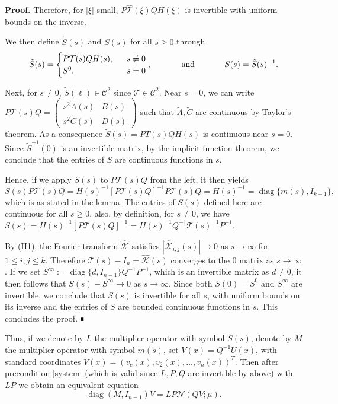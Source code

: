 \documentclass[letterpaper,11pt]{article}
\newcommand{\Nl}{\mathcal{N}}
\newcommand{\K}{\mathcal{K}}
\newcommand{\That}{\widehat{\mathcal{T}}}
\newcommand{\diag}{\operatorname{diag}}
\numberwithin{equation}{section}
\theoremstyle{plain}
\theoremstyle{remark}
\newenvironment{Proof}[1][.]%
 {\begin{trivlist}\item[]\textbf{Proof#1 }}%
 {\hspace*{\fill}$\rule{0.3\baselineskip}{0.35\baselineskip}$\end{trivlist}}
\begin{document}
\begin{Proof}
Therefore, for $|\xi|$ small, $P\That(\xi)QH(\xi)$ is invertible with uniform bounds on the inverse.

 We then define $\tilde{S}(s)$ and $S(s)$ for all $s\ge 0$ through
\[
\tilde{S}(s)=\begin{cases}
P\mathcal{T}(s)QH(s),\hspace{0.1in} &s\neq 0\\ 
S^0.\hspace{0.1in} &s=0
\end{cases}, \hspace{0.5in}\text{and}\hspace{0.5in} S(s) = \tilde{S}(s)^{-1}.
\]


Next, for $s \neq 0$, $\tilde{S}(\ell) \in \mathscr{C}^2$ since $\mathcal{T} \in \mathscr{C}^2$. Near $s = 0$, we can write $P\mathcal{T}(s)Q = \begin{pmatrix}
s^2\tilde{A}(s)&B(s)\\
s^2\tilde{C}(s)&D(s)
\end{pmatrix}$ such that $\tilde{A},\tilde{C}$ are continuous by Taylor's theorem. As a consequence $\tilde{S}(s)= PT(s)QH(s)$ is continuous near $s = 0$. Since $\tilde{S}^{-1}(0)$ is an invertible matrix, by the implicit function theorem, we conclude that the entries of $S$ are continuous functions in $s$.
 
Hence, if we apply $S(s)$ to $P\mathcal{T}(s)Q$ from the left, it then yields
 \[
 S(s)P\mathcal{T}(s)Q = H(s)^{-1}[P\mathcal{T}(s)Q]^{-1}P\mathcal{T}(s)Q = H(s)^{-1}=\diag\{m(s),I_{k-1}\},
 \]
 which is as stated in the lemma.
 The entries of $S(s)$ defined here are continuous for all $s \ge 0$,  also, by definition, for $s \neq 0$, we have $S(s) = H(s)^{-1}[P\mathcal{T}(s)Q]^{-1} = H(s)^{-1}Q^{-1}\mathcal{T}(s)^{-1}P^{-1}$.
 
By (H1), the Fourier transform $\widehat{\K}$ satisfies $|\widehat{\K}_{i,j}(s)| \to 0$ as $s \to \infty$ for $1\le i,j\le k$. Therefore $\mathcal{T}(s)-I_n=\widehat{\K}(s)$ converges to the $0$ matrix as $s \to 
\infty$. If we set $S^\infty := \diag\{d,I_{n-1}\}Q^{-1}P^{-1}$, which is an invertible matrix as $d\neq 0$, it then follows that $S(s)-S^\infty\to 0$ as $s \to \infty$. Since both $S(0)=S^0$ and $S^\infty$ are invertible, we conclude that $S(s)$ is invertible for all $s$, with uniform bounds on its inverse and the entries of $S$ are bounded continuous functions in $s$. This concludes the proof.
 \end{Proof}
Thus, if we denote by $L$ the multiplier operator with symbol $S(s)$, denote by $M$ the multiplier operator with symbol $m(s)$, set $V(x)=Q^{-1}U(x)$, with standard coordinates $V(x)=(v_c(x),v_2(x),\ldots,v_{n}(x))^T$. Then after precondition \eqref{system} (which is valid since $L,P,Q$ are invertible by above) with $LP$ we obtain an equivalent equation
\begin{equation}\label{TranEq}
\diag(M, I_{n-1})V=LP\Nl(QV;\mu).
\end{equation}
\end{document}
